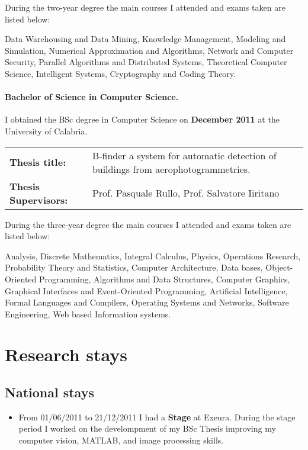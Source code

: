 \documentclass[a4paper,10pt]{article}
\begin{document}
\noindent During the two-year degree the main courses I attended and exams taken are listed below: 

\noindent Data Warehousing and Data Mining, Knowledge Management, Modeling and Simulation, Numerical Approximation and Algorithms, 
Network and Computer Security, Parallel Algorithms and Distributed Systems, Theoretical Computer Science, Intelligent Systems, 
Cryptography and Coding Theory.

\paragraph{Bachelor of Science in Computer Science.} 

I obtained the BSc degree in Computer Science on \textbf{December 2011} at the
University of Calabria.\\

{\centering
\begin{tabular}{l l}
\textbf{Thesis title:}&B-finder a system for automatic detection of buildings from aerophotogrammetries. \\
\textbf{Thesis Supervisors:} & Prof. Pasquale Rullo, Prof. Salvatore Iiritano\\
\end{tabular}
}
\noindent During the three-year degree the main courses I attended and exams taken are listed below:

\noindent Analysis, Discrete Mathematics, Integral Calculus, Physics,
 Operations Research, Probability Theory and Statistics, Computer Architecture,
 Data bases, Object-Oriented Programming, Algorithms and Data Structures,
 Computer Graphics, Graphical Interfaces and Event-Oriented Programming,
 Artificial Intelligence, Formal Languages and Compilers, Operating Systems and
 Networks, Software Engineering, Web based Information systems.

\section{Research stays}
\subsection{National stays}

\begin{itemize}
\item From 01/06/2011 to 21/12/2011 I had a \textbf{Stage} at Exeura.
During the stage period I worked on the develompment of my BSc Thesis
improving my computer vision, MATLAB, and image processing skills.
\end{itemize}
\end{document}
